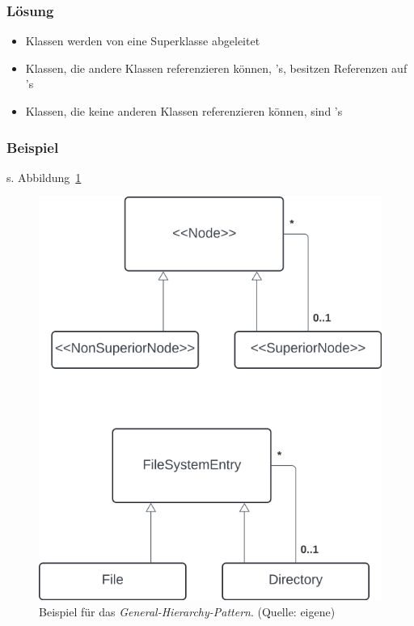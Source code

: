 \subsubsection*{Lösung}
\begin{itemize}
    \item Klassen werden von eine Superklasse  abgeleitet
    \item Klassen, die andere Klassen referenzieren können, 's, besitzen Referenzen auf 's
    \item Klassen, die keine anderen Klassen referenzieren können, sind 's
\end{itemize}

\subsubsection*{Beispiel}
s. Abbildung~\ref{fig:generalhierarchy}

\begin{figure}
    \centering
    \includegraphics[scale=0.4]{part two/Objektorientierte Analyse/img/generalhierarchy}
    \caption{Beispiel für das \textit{General-Hierarchy-Pattern}. (Quelle: eigene)}
    \label{fig:generalhierarchy}
\end{figure}


